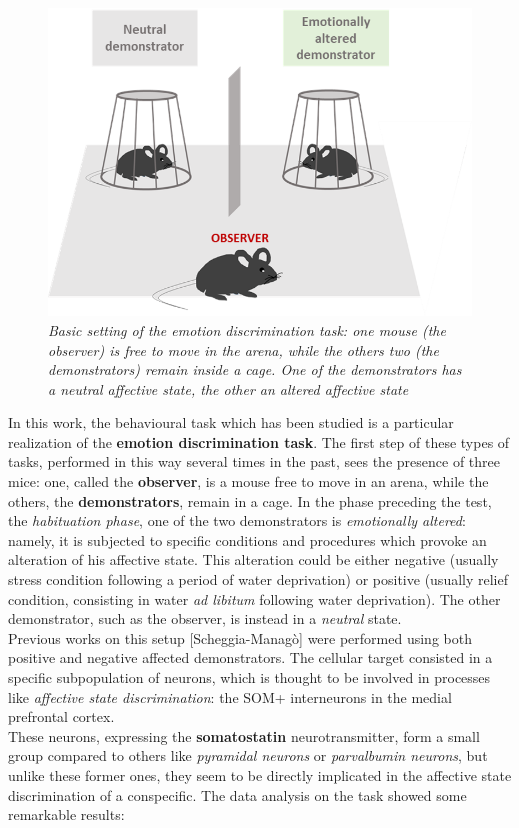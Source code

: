 \documentclass[a4paper]{article}
\begin{document}
\begin{figure}
	\begin{center}
		\includegraphics[scale=.60]{mice_task.png} 
	\end{center} 
	\caption{\textit{Basic setting of the emotion discrimination task: one mouse (the \textit{observer}) is free to move in the arena, while the others two (the \textit{demonstrators}) remain inside a cage. One of the demonstrators has a neutral affective state, the other an altered affective state}}
	
\end{figure}
In this work, the behavioural task which has been studied is a particular realization of the \textbf{emotion discrimination task}. The first step of these types of tasks, performed in this way several times in the past, sees the presence of three mice: one, called the \textbf{observer}, is a mouse free to move in an arena, while the others, the \textbf{demonstrators}, remain in a cage. In the phase preceding the test, the \textit{habituation phase}, one of the two demonstrators is \textit{emotionally altered}: namely, it is subjected to specific conditions and procedures which provoke an alteration of his affective state. This alteration could be either negative (usually stress condition following a period of water deprivation) or positive (usually relief condition, consisting in water \textit{ad libitum} following water deprivation). The other demonstrator, such as the observer, is instead in a \textit{neutral} state.\\

Previous works on this setup [Scheggia-Managò] were performed using both positive and negative affected demonstrators. The cellular target consisted in a specific subpopulation of neurons, which is thought to be involved in processes like \textit{affective state discrimination}: the SOM+ interneurons in the medial prefrontal cortex.\\
These neurons, expressing the \textbf{somatostatin} neurotransmitter, form a small group compared to others like \textit{pyramidal neurons} or \textit{parvalbumin neurons}, but unlike these former ones, they seem to be directly implicated in the affective state discrimination of a conspecific. The data analysis on the task showed some remarkable results:
\end{document}

